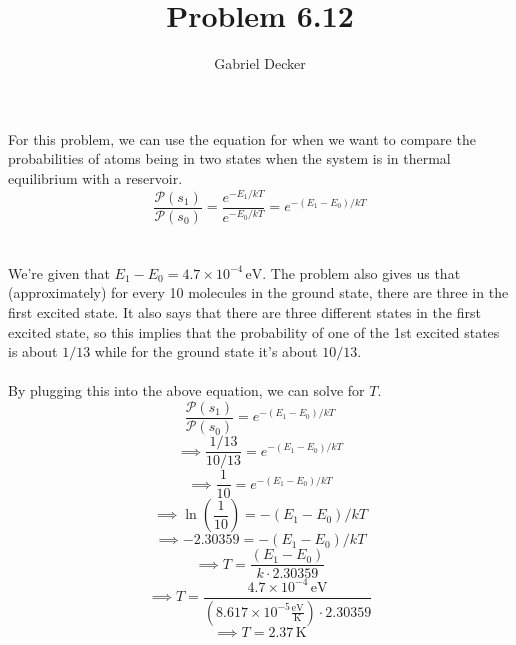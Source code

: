 \documentclass[12pt]{article}
\title{Problem 6.12}
\author{Gabriel Decker}
\newcommand{\boltzmannConstInEV}{8.617\times10^{-5}\frac{\text{eV}}{\text{K}}}
\begin{document}
\maketitle
\begin{flushleft}

For this problem, we can use the equation for when we want to compare the probabilities of atoms being in two states when the system is in thermal equilibrium with a reservoir.
\begin{equation}
    \frac{\mathcal{P}(s_1)}{\mathcal{P}(s_0)}=\frac{e^{-E_1/kT}}{e^{-E_0/kT}}=e^{-(E_1-E_0)/kT}
\end{equation}\\~\\

We're given that $E_1-E_0=4.7\times10^{-4}\,\text{eV}$.
The problem also gives us that (approximately) for every 10 molecules in the ground state, there are three in the first excited state. It also says that there are three different states in the first excited state, so this implies that the probability of one of the 1st excited states is about $1/13$ while for the ground state it's about $10/13$.\\~\\

By plugging this into the above equation, we can solve for $T$.
$$\frac{\mathcal{P}(s_1)}{\mathcal{P}(s_0)}=e^{-(E_1-E_0)/kT}$$
$$\implies\frac{1/13}{10/13}=e^{-(E_1-E_0)/kT}$$
$$\implies\frac{1}{10}=e^{-(E_1-E_0)/kT}$$
$$\implies\ln\left(\frac{1}{10}\right)=-(E_1-E_0)/kT$$
$$\implies-2.30359=-(E_1-E_0)/kT$$
$$\implies T=\frac{(E_1-E_0)}{k\cdot2.30359}$$
$$\implies T=\frac{4.7\times10^{-4}\,\text{eV}}{(\boltzmannConstInEV)\cdot2.30359}$$
$$\implies T=2.37\,\text{K}$$


\end{flushleft}
\end{document}

